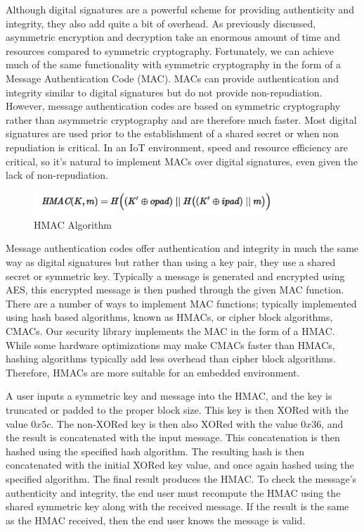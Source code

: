Although digital signatures are a powerful scheme for providing authenticity and integrity, they also add quite a bit of overhead. As previously discussed, asymmetric encryption and decryption take an enormous amount of time and resources compared to symmetric cryptography. Fortunately, we can achieve much of the same functionality with symmetric cryptography in the form of a Message Authentication Code (MAC). MACs can provide authentication and integrity similar to digital signatures but do not provide non-repudiation. However, message authentication codes are based on symmetric cryptography rather than asymmetric cryptography and are therefore much faster. Most digital signatures are used prior to the establishment of a shared secret or when non repudiation is critical. In an IoT environment, speed and resource efficiency are critical, so it's natural to implement MACs over digital signatures, even given the lack of non-repudiation. 

 \begin{figure}[t]
	\centering
	\includegraphics[width=9cm,height=0.7\textheight,keepaspectratio]{./figures/figure_5}
	\center\caption[font=footnote]{HMAC Algorithm}
\end{figure}

Message authentication codes offer authentication and integrity in much the same way as digital signatures but rather than using a key pair, they use a shared secret or symmetric key. Typically a message is generated and encrypted using AES, this encrypted message is then pushed through the given MAC function. There are a number of ways to implement MAC functions; typically implemented using hash based algorithms, known as HMACs, or cipher block algorithms, CMACs. Our security library implements the MAC in the form of a HMAC. While some hardware optimizations may make CMACs faster than HMACs, hashing algorithms typically add less overhead than cipher block algorithms. Therefore, HMACs are more suitable for an embedded environment. 

A user inputs a symmetric key and message into the HMAC, and the key is truncated or padded to the proper block size. This key is then XORed with the value $0x5c$. The non-XORed key is then also XORed with the value $0x36$, and the result is concatenated with the input  message. This concatenation is then hashed using the specified hash algorithm. The resulting hash is then concatenated with the initial XORed key value, and once again hashed using the specified algorithm. The final result produces the HMAC. To check the message's authenticity and integrity, the end user must recompute the HMAC using the shared symmetric key along with the received message. If the result is the same as the HMAC received, then the end user knows the message is valid.

